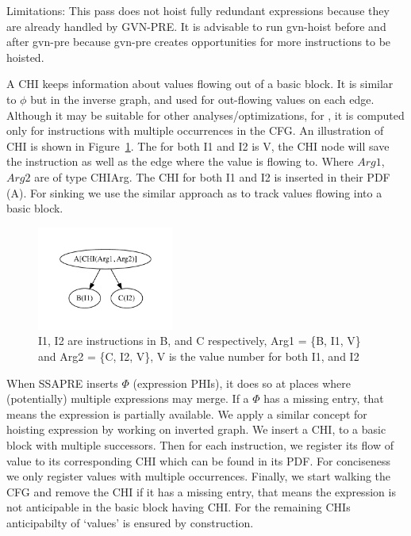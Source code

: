 \documentclass[sigplan,10pt,review,anonymous]{acmart}\settopmatter{printfolios=true,printccs=false,printacmref=false}
\begin{document}
Limitations: This pass does not hoist fully redundant expressions because they
are already handled by GVN-PRE. It is advisable to run gvn-hoist before and
after gvn-pre because gvn-pre creates opportunities for more instructions to be
hoisted.


A CHI keeps information about values flowing out of a basic block.  It is
similar to $\phi$ \cite{ssa} but in the inverse graph, and used for out-flowing
values on each edge. Although it may be suitable for other
analyses/optimizations, for \GCM{}, it is computed only for instructions with
multiple occurrences in the CFG. An illustration of CHI is shown in
Figure~\ref{fig:chi-intro}. The \GVN{} for both I1 and I2 is V, the CHI node
will save the instruction as well as the edge where the value is flowing to.
Where $Arg1$, $Arg2$ are of type CHIArg. The CHI for both I1 and I2 is
inserted in their PDF (A). For sinking we use the similar approach as
\cite{ssapre} to track values flowing into a basic block.


\begin{figure}
  \includegraphics[width=0.4\textwidth]{chi-example.pdf}
  \vspace*{-1.0cm}
\caption{I1, I2 are instructions in B, and C respectively, Arg1 = \{B, I1,
  V\} and Arg2 = \{C, I2, V\}, V is the value number for both I1, and I2}
\label{fig:chi-intro}
\end{figure}


When SSAPRE inserts $\Phi$ (expression PHIs), it does so at places where
(potentially) multiple expressions may merge. If a $\Phi$ has a missing entry,
that means the expression is partially available.  We apply a similar concept
for hoisting expression by working on inverted graph. We insert a CHI, to a
basic block with multiple successors. Then for each instruction, we register its
flow of value to its corresponding CHI which can be found in its PDF. For
conciseness we only register values with multiple occurrences. Finally, we start
walking the CFG and remove the CHI if it has a missing entry, that means the
expression is not anticipable in the basic block having CHI. For the remaining
CHIs anticipabilty of `values' is ensured by construction.
\end{document}
